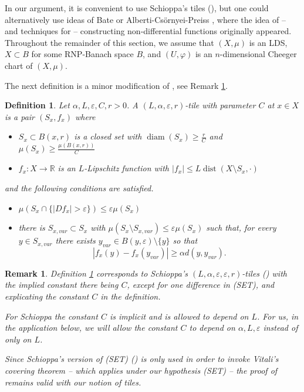 \documentclass{amsart}
\newtheorem{definition}[theorem]{Definition}
\newtheorem{remark}[theorem]{Remark}
\numberwithin{equation}{section}
\newcommand{\R}{\mathbb{R}}
\newcommand{\dist}{\operatorname{dist}}
\newcommand{\diam}{\operatorname{diam}}
\begin{document}
In our argument, it is convenient to use Schioppa's tiles (\cite[Definition 4.2]{sch16a}), but one could alternatively use ideas of Bate \cite{bate12diff} or Alberti-Csörnyei-Preiss \cite{acp}, where the idea of -- and techniques for -- constructing non-differential functions originally appeared. Throughout the remainder of this section, we assume that $(X,\mu)$ is an LDS, $X\subset B$ for some RNP-Banach space $B$, and $(U,\varphi)$ is an $n$-dimensional Cheeger chart of $(X,\mu)$.

The next definition is a minor modification of \cite[Definition 4.2]{sch16a}, see Remark \ref{rmk:tiles}.

\begin{definition}\label{def:tiles}
Let $\alpha,L,\varepsilon,C, r>0$. A $(L,\alpha,\varepsilon,r)$-tile with parameter $C$ at $x\in X$ is a pair $(S_x,f_x)$ where 
\begin{itemize}
	\item[(SET)] $S_x\subset  B(x,r)$ is a closed set with $\diam(S_x)\ge \frac rC$ and $\mu(S_x)\ge \frac {\mu(B(x,r))}C$
	\item[(FUN)]  $f_x:X\to \R$ is an $L$-Lipschitz function with $|f_x|\le L\dist(X\setminus S_x,\cdot)$
\end{itemize} 
and the following conditions are satisfied.
\begin{itemize}
	\item[(T1)] $\mu(S_x\cap \{|Df_x|>\varepsilon\})\le \varepsilon \mu(S_x)$
	\item[(T2)] there is $S_{x,var}\subset S_x$ with $\mu(S_x\setminus S_{x,var})\le \varepsilon\mu(S_x)$ such that, for every $y\in S_{x,var}$ there exists $y_{var}\in B(y,\varepsilon)\setminus\{y\}$ so that
	\[
	|f_x(y)-f_x(y_{var})|\ge \alpha d(y,y_{var}).
	\]
\end{itemize}
\end{definition}

\begin{remark}\label{rmk:tiles}
Definition \ref{def:tiles} corresponds to Schioppa's $(L,\alpha,\varepsilon,\varepsilon,r)$-tiles (\cite[Definition 4.2]{sch16a}) with the implied constant there being $C$, except for one difference in (SET), and explicating the constant $C$ in the definition. 

For Schioppa the constant $C$ is implicit and is allowed to depend on $L$. For us, in the application below, we will allow the constant $C$ to depend on $\alpha,L,\varepsilon$ instead of only on $L$. 

Since Schioppa's version of (SET) (\cite[Definition 4.2(T1) \& (T2)]{sch16a}) is only used in order to invoke Vitali's covering theorem -- which applies under our hypothesis (SET) -- the proof of \cite[Theorem 4.3]{sch16a} remains valid with our notion of tiles. 
\end{remark}
\end{document}
